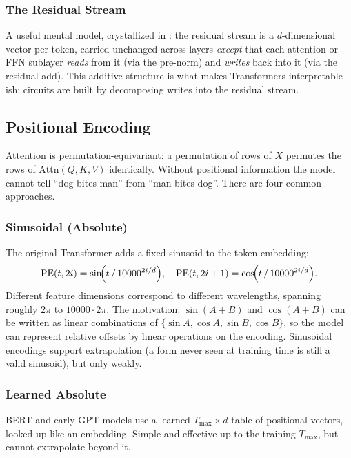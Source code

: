 \subsubsection{The Residual Stream}

A useful mental model, crystallized in
\citet{elhage2021mathematical}: the residual stream is a
$d$-dimensional vector per token, carried unchanged across layers
\emph{except} that each attention or FFN sublayer \emph{reads} from it
(via the pre-norm) and \emph{writes} back into it (via the residual
add). This additive structure is what makes Transformers
interpretable-ish: circuits are built by decomposing writes into the
residual stream.

\subsection{Positional Encoding}

Attention is permutation-equivariant: a permutation of rows of $X$
permutes the rows of $\mathrm{Attn}(Q, K, V)$ identically. Without
positional information the model cannot tell ``dog bites man'' from
``man bites dog''. There are four common approaches.

\subsubsection{Sinusoidal (Absolute)}

The original Transformer \citep{vaswani2017attention} adds a fixed
sinusoid to the token embedding:
\begin{equation}
\label{eq:week4-sinusoidal}
\mathrm{PE}(t, 2i)     = \sin\!\Bigl(t \,/\, 10000^{2i/d}\Bigr),
\quad
\mathrm{PE}(t, 2i+1)   = \cos\!\Bigl(t \,/\, 10000^{2i/d}\Bigr).
\end{equation}
Different feature dimensions correspond to different wavelengths,
spanning roughly $2\pi$ to $10000 \cdot 2\pi$. The motivation:
$\sin(A+B)$ and $\cos(A+B)$ can be written as linear combinations of
$\{\sin A, \cos A, \sin B, \cos B\}$, so the model can represent
relative offsets by linear operations on the encoding. Sinusoidal
encodings support extrapolation (a form never seen at training time
is still a valid sinusoid), but only weakly.

\subsubsection{Learned Absolute}

BERT \citep{devlin2019bert} and early GPT models use a learned
$T_{\max} \times d$ table of positional vectors, looked up like an
embedding. Simple and effective up to the training $T_{\max}$, but
cannot extrapolate beyond it.

